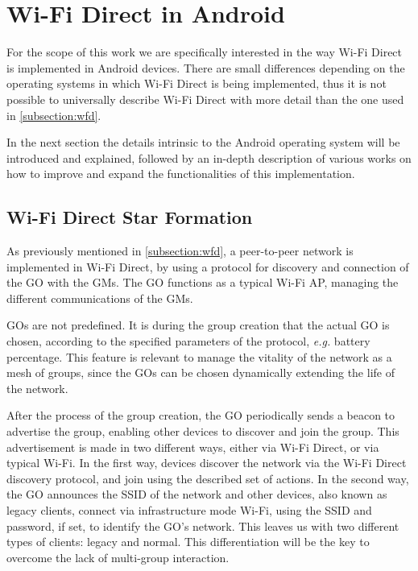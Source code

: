 
\section{Wi-Fi Direct in Android}
\label{sec:wfd}

For the scope of this work we are specifically interested in the way Wi-Fi Direct is implemented in Android devices. There are small differences depending on the operating systems in which Wi-Fi Direct is being implemented, thus it is not possible to universally describe Wi-Fi Direct with more detail than the one used in \ref{subsection:wfd}.

In the next section the details intrinsic to the Android operating system will be introduced and explained, followed by an in-depth description of various works on how to improve and expand the functionalities of this implementation.

\subsection{Wi-Fi Direct Star Formation}
\label{subsection:wfdstar}

As previously mentioned in \ref{subsection:wfd}, a peer-to-peer network is implemented in Wi-Fi Direct, by using a protocol for discovery and connection of the \gls{GO} with the \glspl{GM}. The \gls{GO} functions as a typical Wi-Fi \gls{AP}, managing the different communications of the \glspl{GM}.

\glspl{GO} are not predefined. It is during the group creation that the actual \gls{GO} is chosen, according to the specified parameters of the protocol, \textit{e.g.} battery percentage. This feature is relevant to manage the vitality of the network as a mesh of groups, since the \glspl{GO} can be chosen dynamically extending the life of the network.

After the process of the group creation, the \gls{GO} periodically sends a beacon to advertise the group, enabling other devices to discover and join the group. This advertisement is made in two different ways, either via Wi-Fi Direct, or via typical Wi-Fi. In the first way, devices discover the network via the Wi-Fi Direct discovery protocol, and join using the described set of actions. In the second way, the \gls{GO} announces the \gls{SSID} of the network and other devices, also known as legacy clients, connect via infrastructure mode Wi-Fi, using the \gls{SSID} and password, if set, to identify the \gls{GO}'s network. This leaves us with two different types of clients: legacy and normal. This differentiation will be the key to overcome the lack of multi-group interaction.

